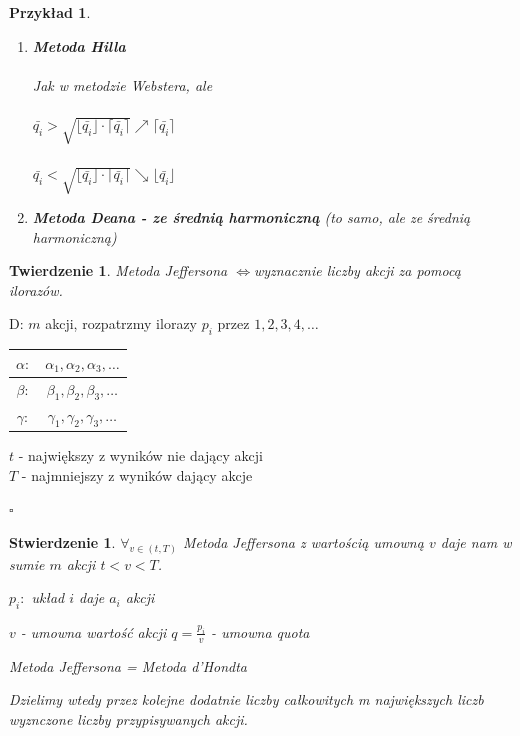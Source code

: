 \documentclass[12pt,a4paper]{article}
\newcounter{twierdzenie}
\theoremstyle{break}
\newtheorem{theorem}{Twierdzenie}[section]
\newtheorem{example}{Przykład}[section]
\newtheorem{stwierdzenie}{Stwierdzenie}[section]
\newcommand{\witw}{$\Leftrightarrow$}
\begin{document}
\begin{example}
\begin{enumerate}[1)]
			\item \textbf{Metoda Hilla}\\\\
			Jak w metodzie Webstera, ale\\\\
			$\bar{q_i} > \sqrt{\lfloor \bar{q_i} \rfloor \cdot \lceil \bar{q_i} \rceil} \nearrow \lceil \bar{q_i} \rceil$\\\\
			$\bar{q_i} < \sqrt{\lfloor \bar{q_i} \rfloor \cdot \lceil \bar{q_i} \rceil} \searrow \lfloor \bar{q_i} \rfloor$
			
			\item \textbf{Metoda Deana - ze średnią harmoniczną} (to samo, ale ze średnią harmoniczną)
		\end{enumerate}
	\end{example}
	
	\begin{theorem}
		Metoda Jeffersona \witw wyznacznie liczby akcji za pomocą ilorazów.
	\end{theorem}
	D: $m$ akcji, rozpatrzmy ilorazy $p_i$ przez $1,2,3,4,\dots$
	\begin{tabular}{c|c}
		$\alpha:$&$\alpha_1,\alpha_2,\alpha_3,\dots$\\\hline
		$\beta:$&$\beta_1,\beta_2,\beta_3,\dots$\\\hline
		$\gamma:$&$\gamma_1,\gamma_2,\gamma_3,\dots$\\\hline
	\end{tabular}
	
	$t$ - największy z wyników nie dający akcji\\
	$T$ - najmniejszy z wyników dający akcje
	\begin{flushright}$\square$\end{flushright}
	
	 \begin{stwierdzenie}
	 	$\forall_{v\in (t,T)}$ Metoda Jeffersona z wartością umowną $v$ daje nam w sumie $m$ akcji $t<v<T$.
	 	
	 	$p_i:$ układ $i$ daje $a_i$ akcji
	 	
	 	$v$ - umowna wartość akcji
	 	$\overset{~}{q}=\frac{p_i}{v}$ - umowna quota
	 	
	 	Metoda Jeffersona = Metoda d'Hondta
	 	
	 	Dzielimy wtedy przez kolejne dodatnie liczby całkowitych m największych liczb wyznczone liczby przypisywanych akcji.
	 \end{stwierdzenie}
	
\end{document}
